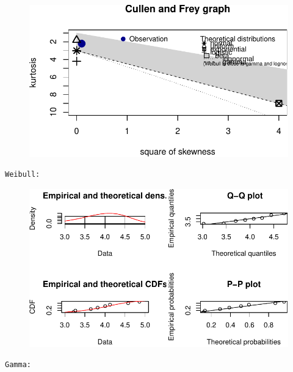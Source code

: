 \documentclass[
  letterpaper,
  DIV=11,
  numbers=noendperiod]{scrartcl}
\begin{document}
\begin{figure}[H]

{\centering \includegraphics{quiz5_files/figure-pdf/unnamed-chunk-39-1.pdf}

}

\end{figure}

\begin{verbatim}
Weibull: 
\end{verbatim}

\begin{figure}[H]

{\centering \includegraphics{quiz5_files/figure-pdf/unnamed-chunk-39-2.pdf}

}

\end{figure}

\begin{verbatim}
Gamma: 
\end{verbatim}
\end{document}
